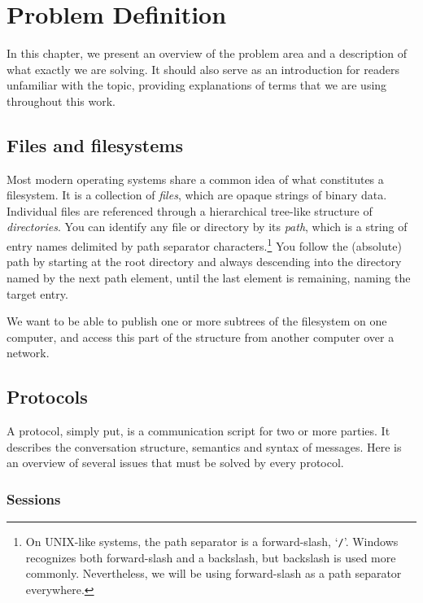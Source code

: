 
\chapter{Problem Definition}

In this chapter, we present an overview of the problem area and a description of what exactly we are solving.
It should also serve as an introduction for readers unfamiliar with the topic, providing explanations of terms
that we are using throughout this work.


\section{Files and filesystems}

Most modern operating systems share a common idea of what constitutes a filesystem. It is a collection of {\it
files}, which are opaque strings of binary data. Individual files are referenced through a hierarchical
tree-like structure of {\it directories}.  You can identify any file or directory by its {\it path}, which is
a string of entry names delimited by path separator characters.\footnote{On UNIX-like systems, the path
separator is a forward-slash, `\texttt{/}'. Windows recognizes both forward-slash and a backslash, but
backslash is used more commonly. Nevertheless, we will be using forward-slash as a path separator everywhere.}
You follow the (absolute) path by starting at the root directory and always descending into the directory
named by the next path element, until the last element is remaining, naming the target entry.

We want to be able to publish one or more subtrees of the filesystem on one computer, and access this part of
the structure from another computer over a network.


\section{Protocols}

A protocol, simply put, is a communication script for two or more parties. It describes the conversation
structure, semantics and syntax of messages. Here is an overview of several issues that must be solved by
every protocol.


\subsection{Sessions}

